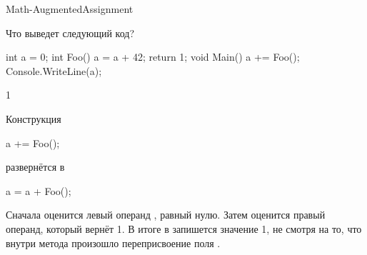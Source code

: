 \begin{defproblem}{Math-AugmentedAssignment}
\begin{onlyproblem}
  Что выведет следующий код?
  \begin{source}
  int a = 0;
  int Foo()
  {
    a = a + 42;
    return 1;
  }
  void Main()
  {
    a += Foo();
    Console.WriteLine(a);
  }
  \end{source}
\end{onlyproblem}
\begin{onlysolution}
  \begin{source}
  1
  \end{source}
  Конструкция
  \begin{source}
  a += Foo();
  \end{source}
  развернётся в
  \begin{source}
  a = a + Foo();
  \end{source}
  Сначала оценится левый операнд , равный нулю. Затем оценится правый операнд, который вернёт 1. В итоге в  запишется значение 1, не смотря на то, что внутри метода  произошло переприсвоение поля .
\end{onlysolution}
\end{defproblem}
